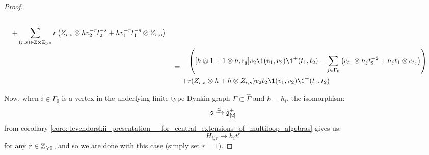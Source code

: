 \begin{proof}
$$\begin{aligned}
\begin{aligned}
                                    \\
                                    + & \sum_{(r, s) \in \Z \x \Z_{> 0}} r \left( Z_{r, s} \tensor h v_2^{-r} t_2^{-s} + h v_1^{-r} t_1^{-s}  \tensor Z_{r, s}
                                    \right)
                                \end{aligned}
                                \\
                                & =
                                \begin{aligned}
                                    & \left( [h \tensor 1 + 1 \tensor h, \sfr_{\g}] v_2 \1(v_1, v_2) \1^+(t_1, t_2) - \sum_{j \in \Gamma_0} \left( c_{t_1} \tensor h_j t_2^{-2} + h_j t_1 \tensor c_{t_2} \right)
                                    \right)
                                    \\
                                    + & r ( Z_{r, s} \tensor h + h \tensor Z_{r, s} ) v_2 t_2 \1(v_1, v_2) \1^+(t_1, t_2)
                                \end{aligned}
                            \end{aligned}
                        $$

                    Now, when $i \in \Gamma_0$ is a vertex in the underlying finite-type Dynkin graph $\Gamma \subset \hat{\Gamma}$ and $h = h_i$, the isomorphism:
                        $$\mathfrak{s} \xrightarrow[]{\simeq} \tilde{\mathfrak{g}}_{[2]}^+$$
                    from corollary \ref{coro: levendorskii_presentation__for_central_extensions_of_multiloop_algebras} gives us:
                        $$H_{i, r} \mapsto h_i t^r$$
                    for any $r \in \mathbb{Z}_{\geqslant 0}$, and so we are done with this case (simply set $r = 1$). 


\end{proof}
